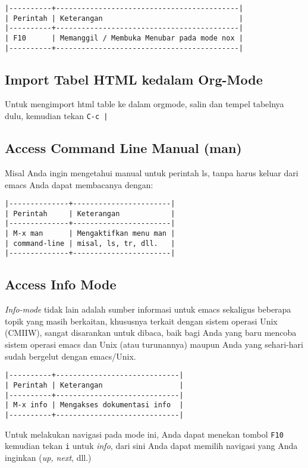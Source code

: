 \documentclass{article}
\begin{document}
\begin{verbatim}
|----------+-------------------------------------------|
| Perintah | Keterangan                                |
|----------+-------------------------------------------|
| F10      | Memanggil / Membuka Menubar pada mode nox |
|----------+-------------------------------------------|
\end{verbatim}

\subsection{Import Tabel HTML kedalam Org-Mode}
Untuk mengimport html table ke dalam orgmode, salin dan tempel tabelnya dulu, kemudian tekan 
\verb=C-c |=

\subsection{Access Command Line Manual (man)}
Misal Anda ingin mengetahui manual untuk perintah ls, tanpa harus keluar dari
emacs Anda dapat membacanya dengan:

\begin{verbatim}
|--------------+-----------------------|
| Perintah     | Keterangan            |
|--------------+-----------------------|
| M-x man      | Mengaktifkan menu man |
| command-line | misal, ls, tr, dll.   |
|--------------+-----------------------|
\end{verbatim}

\subsection{Access Info Mode}
\emph{Info-mode} tidak lain adalah sumber informasi untuk emacs sekaligus beberapa topik yang masih berkaitan, khususnya terkait dengan sistem operasi Unix 
(CMIIW), sangat disarankan untuk dibaca, baik bagi Anda yang baru mencoba 
sistem operasi emacs dan Unix (atau turunannya) maupun Anda yang sehari-hari 
sudah bergelut dengan emacs/Unix.

\begin{verbatim}
|----------+-----------------------------|
| Perintah | Keterangan                  |
|----------+-----------------------------|
| M-x info | Mengakses dokumentasi info  |
|----------+-----------------------------|
\end{verbatim}

Untuk melakukan navigasi pada mode ini, Anda dapat menekan tombol \verb=F10=
kemudian tekan \verb=i= untuk \emph{info}, dari sini Anda dapat memilih
navigasi yang Anda inginkan (\emph{up, next}, dll.)
\end{document}
